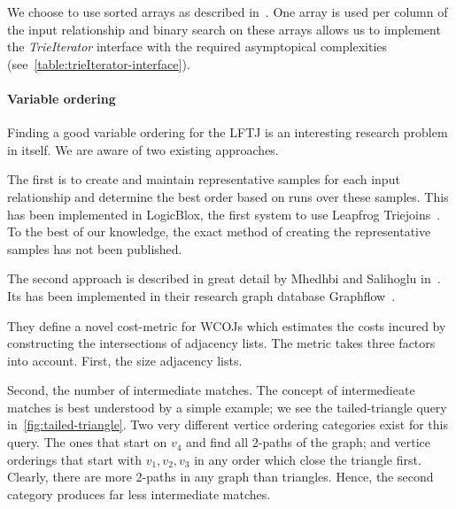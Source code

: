 We choose to use sorted arrays as described in~\cite{myria-detailed}.
One array is used per column of the input relationship and binary search on these arrays allows us to implement the \textit{TrieIterator}
interface with the required asymptopical complexities (see~\cref{table:trieIterator-interface}).


\paragraph{Variable ordering}  %
Finding a good variable ordering for the \textsc{LFTJ} is an interesting research problem in itself.
We are aware of two existing approaches.

The first is to create and maintain representative samples for each input relationship and determine the best order based on runs over
these samples.
This has been implemented in LogicBlox, the first system to use Leapfrog Triejoins~\cite{logicBlox}.
To the best of our knowledge, the exact method of creating the representative samples has not been published.

The second approach is described in great detail by Mhedhbi and Salihoglu in~\cite{mhedhbi2019}.
Its has been implemented in their research graph database Graphflow~\cite{graphflow}.

They define a novel cost-metric for \textsc{WCOJ}s which estimates the costs incured by constructing the intersections of adjacency
lists.
The metric takes three factors into account.
First, the size adjacency lists.

Second, the number of intermediate matches.
The concept of intermedieate matches is best understood by a simple example;
we see the tailed-triangle query in~\cref{fig:tailed-triangle}.
Two very different vertice ordering categories exist for this query.
The ones that start on $v_4$ and find all 2-paths of the graph;
and vertice orderings that start with $v_1, v_2, v_3$ in any order which close the triangle first.
Clearly, there are more 2-paths in any graph than triangles.
Hence, the second category produces far less intermediate matches.

